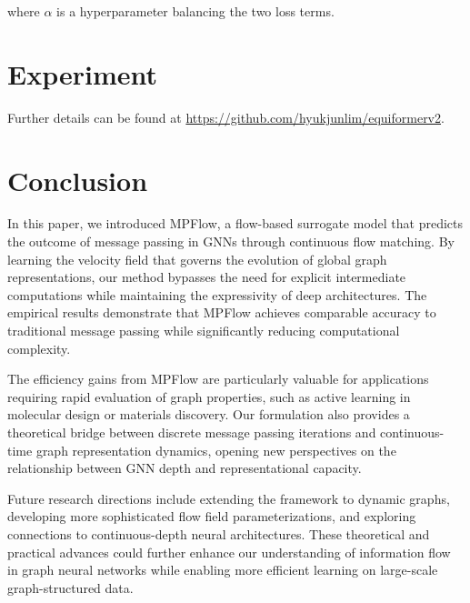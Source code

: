 \documentclass{article}
\begin{document}
where $\alpha$ is a hyperparameter balancing the two loss terms. 

\section{Experiment}
Further details can be found at \href{https://github.com/hyukjunlim/equiformerv2}{https://github.com/hyukjunlim/equiformerv2}.

\section{Conclusion}

In this paper, we introduced MPFlow, a flow-based surrogate model that predicts the outcome of message passing in GNNs through continuous flow matching. 
By learning the velocity field that governs the evolution of global graph representations, our method bypasses the need for explicit intermediate computations while maintaining the expressivity of deep architectures. 
The empirical results demonstrate that MPFlow achieves comparable accuracy to traditional message passing while significantly reducing computational complexity.

The efficiency gains from MPFlow are particularly valuable for applications requiring rapid evaluation of graph properties, such as active learning in molecular design or materials discovery. 
Our formulation also provides a theoretical bridge between discrete message passing iterations and continuous-time graph representation dynamics, opening new perspectives on the relationship between GNN depth and representational capacity.

Future research directions include extending the framework to dynamic graphs, developing more sophisticated flow field parameterizations, and exploring connections to continuous-depth neural architectures. 
These theoretical and practical advances could further enhance our understanding of information flow in graph neural networks while enabling more efficient learning on large-scale graph-structured data.





\end{document}
